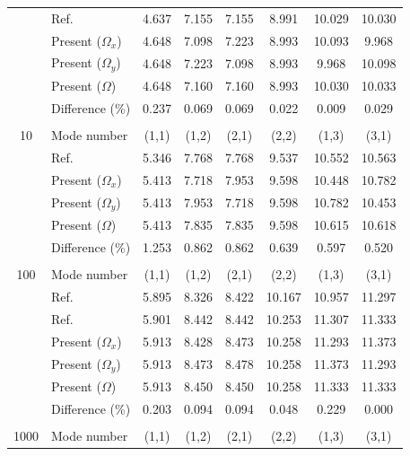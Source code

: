 \documentclass[preprint,12pt,number]{elsarticle}
\begin{document}
\begin{table}[!htbp]
{\begin{tabular}{c l c c c c c c}
	& Ref.\Citealp{zhang2019new} & 4.637 &7.155 & 7.155 & 8.991 & 10.029 & 10.030 \\
	& Present ($\Omega_x$)   & 4.648     & 7.098      &7.223     & 8.993     &   10.093    & 9.968  \\
	& Present ($\Omega_y$)   & 4.648     & 7.223     & 7.098       & 8.993     &   9.968     & 10.098
	\\ 
	& Present ($\Omega$)   & 4.648      & 7.160   & 7.160     & 8.993    &   10.030   & 10.033   \\
	&Difference (\%)& 0.237    & 0.069      & 0.069      & 0.022     &  0.009     &0.029
	\\
	\\
	10 & Mode number   &  (1,1) & (1,2) & (2,1) & (2,2) & (1,3) & (3,1) \\
	& Ref.\Citealp{zhang2019new}  & 5.346 & 7.768 & 7.768 & 9.537 & 10.552 & 10.563 \\
	& Present ($\Omega_x$)   & 5.413      & 7.718      & 7.953     & 9.598     & 10.448      & 10.782 \\
	& Present ($\Omega_y$)   & 5.413     & 7.953     & 7.718      & 9.598    & 10.782      & 10.453
	\\ 
	& Present ($\Omega$)   &5.413      & 7.835     & 7.835     & 9.598   &  10.615    & 10.618  \\
	&Difference (\%)& 1.253     & 0.862      & 0.862      & 0.639     &  0.597     & 0.520  \\
	\\
	100 & Mode number   &  (1,1) & (1,2) & (2,1) & (2,2) & (1,3) & (3,1) \\
	& Ref.\Citealp{mukhopadhyay1979free} & 5.895& 8.326 &8.422 &10.167 &10.957 &11.297 \\
	& Ref.\Citealp{zhang2019new} & 5.901 & 8.442 & 8.442 & 10.253 & 11.307 & 11.333 \\
	& Present ($\Omega_x$)   & 5.913     & 8.428      & 8.473    & 10.258     & 11.293      & 11.373 \\
	& Present ($\Omega_y$)   & 5.913    & 8.473     & 8.478    & 10.258     & 11.373     & 11.293
	\\ 
	& Present ($\Omega$)   & 5.913     & 8.450     & 8.450     & 10.258     &  11.333    & 11.333  \\
	&Difference (\%)& 0.203     & 0.094      & 0.094      & 0.048     & 0.229     & 0.000 \\
	\\
	1000 & Mode number   & (1,1) & (1,2) & (2,1) & (2,2) & (1,3) & (3,1) \\

\end{tabular}}
\end{table}
\end{document}
